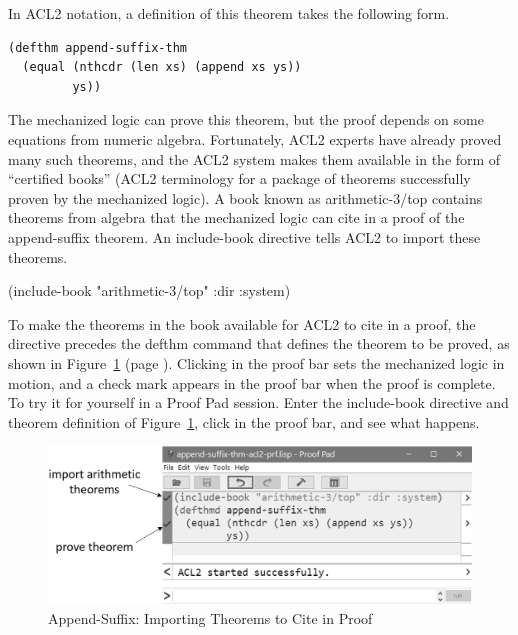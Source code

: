 In ACL2 notation, a definition of this theorem takes the following form.

\begin{Verbatim}
(defthm append-suffix-thm
  (equal (nthcdr (len xs) (append xs ys))
         ys))
\end{Verbatim}

The mechanized logic can prove this theorem, but
the proof depends on some equations from numeric algebra.
Fortunately, ACL2 experts have already proved many such theorems,
and the ACL2 system makes them available in the form of
``certified books''
(ACL2 terminology for a package of theorems successfully proven by the
mechanized logic).
A book known as
\label{arith-top-book}\textsf{arithmetic-3/top}
contains theorems from algebra
that the mechanized logic can cite in
a proof of the append-suffix theorem.
An \textsf{include-book} directive tells ACL2
to import these theorems.
\begin{center}
\textsf{(include-book "arithmetic-3/top" :dir :system)}
\end{center}

To make the theorems in the book available
for ACL2 to cite in a proof,
the directive precedes the \textsf{defthm} command that
defines the theorem to be proved, as shown in
Figure~\ref{fig:append-suffix-acl2-prf} (page \pageref{fig:append-suffix-acl2-prf}).
Clicking in the proof bar sets the mechanized logic in motion,
and a check mark appears in the proof bar when
the proof is complete.
To try it for yourself in a Proof Pad session.
Enter the include-book directive
and theorem definition of Figure~\ref{fig:append-suffix-acl2-prf},
click in the proof bar, and see what happens.

\begin{figure}
\begin{center}
\includegraphics[scale=0.5]{images/append-suffix-thm-acl2-prf-bw.png}
\end{center}
\caption{Append-Suffix: Importing Theorems to Cite in Proof}
\label{fig:append-suffix-acl2-prf}
\end{figure}

